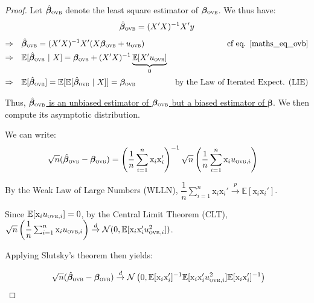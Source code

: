 \documentclass[a4paper, 11pt]{report}
\begin{document}
\begin{proof}
				Let $\hat{\bm{\beta}}_{\textsc{ovb}}$ denote the least square estimator of $\bm{\beta}_{\textsc{ovb}}$. We thus have:
				~
				\begin{equation}
					\hat{\bm{\beta}}_{\textsc{ovb}} = (X'X)^{-1}X'y
				\end{equation}
				\begin{align*}
					\Rightarrow \quad  & \hat{\bm{\beta}}_{\textsc{ovb}} = (X'X)^{-1}X'(X\bm{\beta}_{\textsc{ovb}} + u_{\textsc{ovb}}) & \text{cf eq. \ref{maths_eq_ovb}}\\
					\Rightarrow \quad  & \mathbb{E}[\hat{\bm{\beta}}_{\textsc{ovb}} | X] = \bm{\beta}_{\textsc{ovb}} + (X'X)^{-1}\underbrace{\mathbb{E}[X'u_{\textsc{ovb}}]}_{0} \\
					\Rightarrow \quad  & \mathbb{E}[\hat{\bm{\beta}}_{\textsc{ovb}}] = \mathbb{E}[\mathbb{E}[\hat{\bm{\beta}}_{\textsc{ovb}} | X]] = \bm{\bm{\beta}}_{\textsc{ovb}}& \text{by the Law of Iterated Expect. (LIE)} 
				\end{align*}
				
				Thus, \underline{$\hat{\bm{\beta}}_{\textsc{ovb}}$ is an unbiased estimator of $\bm{\beta}_{\textsc{ovb}}$ but a biased estimator of $\bm{\beta}$}. We then compute its asymptotic distribution. 
				
				We can write: 
				~
				\begin{align*}
					\sqrt{n}(\hat{\bm{\beta}}_{\textsc{ovb}} - \bm{\beta}_{\textsc{ovb}}) &  = \left(\dfrac{1}{n} \sum_{i = 1}^{n} \text{x}_{i} \text{x}_{i}' \right)^{-1} \sqrt{n} \left(\dfrac{1}{n} \sum_{i = 1}^{n} \text{x}_{i} u_{\textsc{ovb}, i} \right)
				\end{align*}	
				
				By the Weak Law of Large Numbers (WLLN), $\dfrac{1}{n} \sum_{i = 1}^{n} \text{x}_{i} \text{x}_{i}'  \overset{p}{\to}  \mathbb{E}[\text{x}_{i}\text{x}_{i}']$. 
				
				Since $\mathbb{E}[\text{x}_{i}u_{\textsc{ovb}, i}] = 0$, by the Central Limit Theorem (CLT), $\sqrt{n} \left(\dfrac{1}{n} \sum_{i = 1}^{n} \text{x}_{i} u_{\textsc{ovb}, i} \right) \overset{d}{\to} \mathcal{N}(0, \mathbb{E}[\text{x}_{i}\text{x}_{i}'u_{\textsc{ovb}, i}^{2}])$. 
				
				Applying Slutsky's theorem then yields:
				
				\[ \sqrt{n}(\hat{\bm{\beta}}_{\textsc{ovb}} - \bm{\beta}_{\textsc{ovb}}) \overset{d}{\to} \mathcal{N}\left(0,  \mathbb{E}[\text{x}_{i}\text{x}_{i}']^{-1} \mathbb{E}[\text{x}_{i}\text{x}_{i}'u_{\textsc{ovb}, i}^{2}] \mathbb{E}[\text{x}_{i}\text{x}_{i}']^{-1}\right) \]
				

\end{proof}
\end{document}
